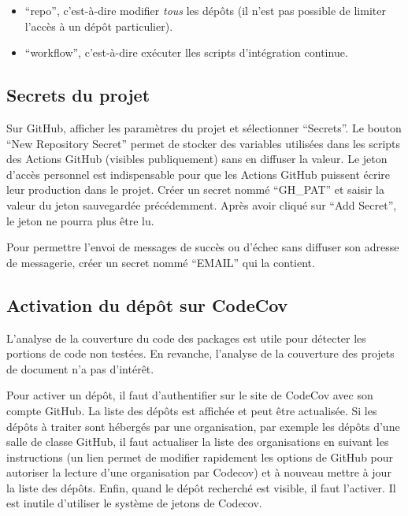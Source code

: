 \documentclass[
  12pt,
  french,
  a4paper,
  extrafontsizes,onecolumn,openright
  ]{memoir}
\providecommand{\tightlist}{%
  \setlength{\itemsep}{0pt}\setlength{\parskip}{0pt}}
\begin{document}
\begin{itemize}
\tightlist
\item
  \enquote{repo}, c'est-à-dire modifier \emph{tous} les dépôts (il n'est pas possible de limiter l'accès à un dépôt particulier).
\item
  \enquote{workflow}, c'est-à-dire exécuter lles scripts d'intégration continue.
\end{itemize}

\subsection{Secrets du projet}\label{sec:secrets-ci}

Sur GitHub, afficher les paramètres du projet et sélectionner \enquote{Secrets}.
Le bouton \enquote{New Repository Secret} permet de stocker des variables utilisées dans les scripts des Actions GitHub (visibles publiquement) sans en diffuser la valeur.
Le jeton d'accès personnel est indispensable pour que les Actions GitHub puissent écrire leur production dans le projet.
Créer un secret nommé \enquote{GH\_PAT} et saisir la valeur du jeton sauvegardée précédemment.
Après avoir cliqué sur \enquote{Add Secret}, le jeton ne pourra plus être lu.

Pour permettre l'envoi de messages de succès ou d'échec sans diffuser son adresse de messagerie, créer un secret nommé \enquote{EMAIL} qui la contient.

\subsection{Activation du dépôt sur CodeCov}\label{activation-du-duxe9puxf4t-sur-codecov}

L'analyse de la couverture du code des packages est utile pour détecter les portions de code non testées.
En revanche, l'analyse de la couverture des projets de document n'a pas d'intérêt.

Pour activer un dépôt, il faut d'authentifier sur le site de CodeCov avec son compte GitHub.
La liste des dépôts est affichée et peut être actualisée.
Si les dépôts à traiter sont hébergés par une organisation, par exemple les dépôts d'une salle de classe GitHub, il faut actualiser la liste des organisations en suivant les instructions (un lien permet de modifier rapidement les options de GitHub pour autoriser la lecture d'une organisation par Codecov) et à nouveau mettre à jour la liste des dépôts.
Enfin, quand le dépôt recherché est visible, il faut l'activer.
Il est inutile d'utiliser le système de jetons de Codecov.
\end{document}
